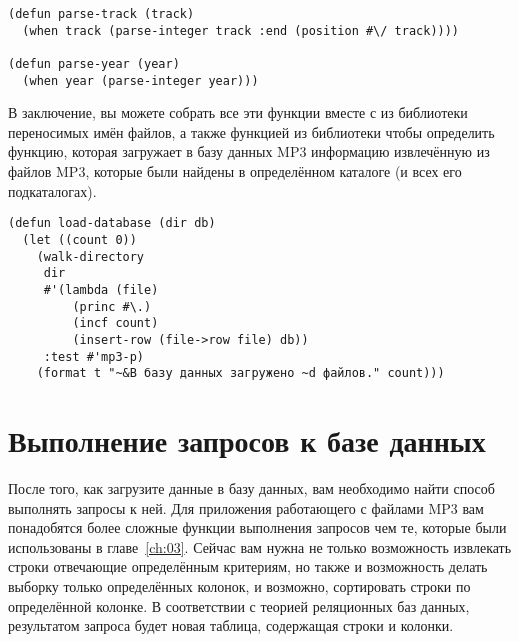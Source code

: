 \begin{lstlisting}
(defun parse-track (track)
  (when track (parse-integer track :end (position #\/ track))))

(defun parse-year (year)
  (when year (parse-integer year)))
\end{lstlisting}

В заключение, вы можете собрать все эти функции вместе с  из
библиотеки переносимых имён файлов, а также функцией  из библиотеки
 чтобы определить функцию, которая загружает в базу данных MP3 информацию
извлечённую из файлов MP3, которые были найдены в определённом каталоге (и всех его
подкаталогах).

\begin{lstlisting}
(defun load-database (dir db)
  (let ((count 0))
    (walk-directory 
     dir 
     #'(lambda (file)
         (princ #\.)
         (incf count)
         (insert-row (file->row file) db))
     :test #'mp3-p)
    (format t "~&В базу данных загружено ~d файлов." count)))
\end{lstlisting}

\section{Выполнение запросов к базе данных}

После того, как загрузите данные в базу данных, вам необходимо найти способ выполнять
запросы к ней.  Для приложения работающего с файлами MP3 вам понадобятся более сложные
функции выполнения запросов чем те, которые были использованы в главе~\ref{ch:03}.  Сейчас
вам нужна не только возможность извлекать строки отвечающие определённым критериям, но
также и возможность делать выборку только определённых колонок, и возможно, сортировать
строки по определённой колонке.  В соответствии с теорией реляционных баз данных,
результатом запроса будет новая таблица, содержащая строки и колонки.

